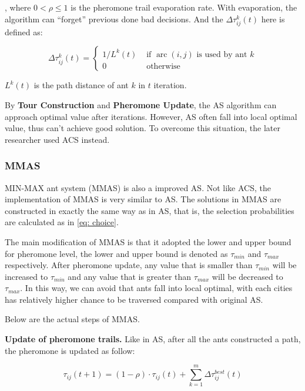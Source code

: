 \documentclass[twocolumn, a4paper]{extarticle}
\begin{document}
, where $0 < \rho \leq 1$ is the pheromone trail evaporation rate. With evaporation, the algorithm can ``forget'' previous done bad decisions. And the $\Delta \tau_{i j}^k(t)$ here is defined as:

\begin{equation}
	\Delta \tau_{i j}^k(t)=\left\{\begin{array}{cl}
		1 / L^k(t) & \text { if } \operatorname{arc}(i, j) \text { is used by ant } k \\
		0 & \text { otherwise }
	\end{array}\right.
\end{equation}

$L^k(t)$ is the path distance of ant $k$ in $t$ iteration.

By \textbf{Tour Construction} and \textbf{Pheromone Update}, the AS algorithm can approach optimal value after iterations. However, AS often fall into local optimal value, thus can't achieve good solution. To overcome this situation, the later researcher used ACS instead. 

\subsubsection{MMAS}

MIN-MAX ant system (MMAS) is also a improved AS. Not like ACS, the implementation of MMAS is very similar to AS. The solutions in MMAS are constructed in exactly the same way as in AS, that is, the selection probabilities are calculated as in \autoref{eq: choice}. 

The main modification of MMAS is that it adopted the lower and upper bound for pheromone level, the lower and upper bound is denoted as $\tau_{min}$ and $\tau_{max}$ respectively. After pheromone update, any value that is smaller than $\tau_{min}$ will be increased to $\tau_{min}$ and any value that is greater than $\tau_{max}$ will be decreased to $\tau_{max}$. In this way, we can avoid that ants fall into local optimal, with each cities has relatively higher chance to be traversed compared with original AS.

Below are the actual steps of MMAS.

\textbf{Update of pheromone trails.} Like in AS, after all the ants constructed a path, the pheromone is updated as follow:

\begin{equation}
	\label{eq: mmas}
	\tau_{i j}(t+1)=(1-\rho) \cdot \tau_{i j}(t)+\sum_{k=1}^m \Delta \tau_{i j}^{best}(t)
\end{equation}
\end{document}
